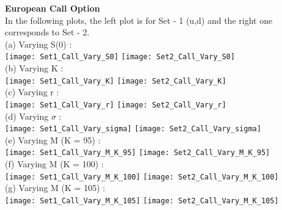 \documentclass{article}
\begin{document}
\textbf{European Call Option }\\
In the following plots, the left plot is for Set - 1 (u,d) and the right one corresponds to Set - 2.\\
(a) Varying S(0) :\\
\texttt{[image: Set1\_Call\_Vary\_S0]}
\quad \quad
\texttt{[image: Set2\_Call\_Vary\_S0]}\\
(b) Varying K :\\
\texttt{[image: Set1\_Call\_Vary\_K]}
\quad \quad
\texttt{[image: Set2\_Call\_Vary\_K]}\\
(c) Varying r :\\
\texttt{[image: Set1\_Call\_Vary\_r]}
\quad \quad
\texttt{[image: Set2\_Call\_Vary\_r]}\\
(d) Varying $\sigma$ :\\
\texttt{[image: Set1\_Call\_Vary\_sigma]}
\quad \quad
\texttt{[image: Set2\_Call\_Vary\_sigma]}\\
(e) Varying M (K = 95) :\\
\texttt{[image: Set1\_Call\_Vary\_M\_K\_95]}
\quad \quad
\texttt{[image: Set2\_Call\_Vary\_M\_K\_95]}\\
\newpage
(f) Varying M (K = 100) :\\
\texttt{[image: Set1\_Call\_Vary\_M\_K\_100]}
\quad \quad
\texttt{[image: Set2\_Call\_Vary\_M\_K\_100]}\\
(g) Varying M (K = 105) :\\
\texttt{[image: Set1\_Call\_Vary\_M\_K\_105]}
\quad \quad
\texttt{[image: Set2\_Call\_Vary\_M\_K\_105]}\\\\
\end{document}
